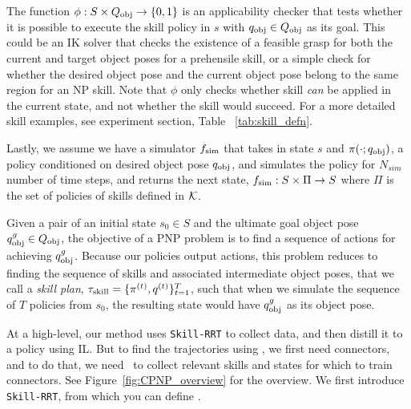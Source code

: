 

The function $\phi:S \times Q_\text{obj} \rightarrow \{0,1\}$ is an applicability checker that tests whether it is possible to execute the skill policy in $s$ with $q_\text{obj} \in Q_\text{obj}$ as its goal. This could be an IK solver that checks the existence of a feasible grasp for both the current and target object poses for a prehensile skill, or a simple check for whether the desired object pose and the current object pose belong to the same region for an NP skill. Note that $\phi$ only checks whether skill \textit{can} be applied in the current state, and not whether the skill would succeed. For a more detailed skill examples, see experiment section, Table ~\ref{tab:skill_defn}.

Lastly, we assume we have a simulator $f_{\text{sim}}$ that takes in state $s$ and $\pi(\cdot;q_\text{obj})$, a policy conditioned on desired object pose $q_\text{obj}$, and simulates the policy for $N_{sim}$ number of time steps, and returns the next state, $f_{\text{sim}}: S \times \Pi \rightarrow S$ where $\Pi$ is the set of policies of skills defined in $\mathcal{K}$. 

Given a pair of an initial state $s_0 \in S$ and the ultimate goal object pose $q_\text{obj}^g \in Q_\text{obj}$, the objective of a PNP problem is to find a sequence of actions for achieving $q_\text{obj}^g$. Because our policies output actions, this problem reduces to finding the sequence of skills and associated intermediate object poses, that we call a \textit{skill plan}, $\tau_{\text{skill}} = \{\pi^{(t)},q^{(t)}\}_{t=1}^{T}$, such that when we simulate the sequence of $T$ policies from $s_0$, the resulting state would have $q_\text{obj}^g$ as its object pose.

At a high-level, our method uses \texttt{Skill-RRT} to collect data, and then distill it to a policy using IL. But to find the trajectories using \skillrrt, we first need connectors, and to do that, we need \lazyskillrrt~to collect relevant skills and states for which to train connectors. See Figure~\ref{fig:CPNP_overview} for the overview. We first introduce \texttt{Skill-RRT}, from which you can define \lazyskillrrt.

